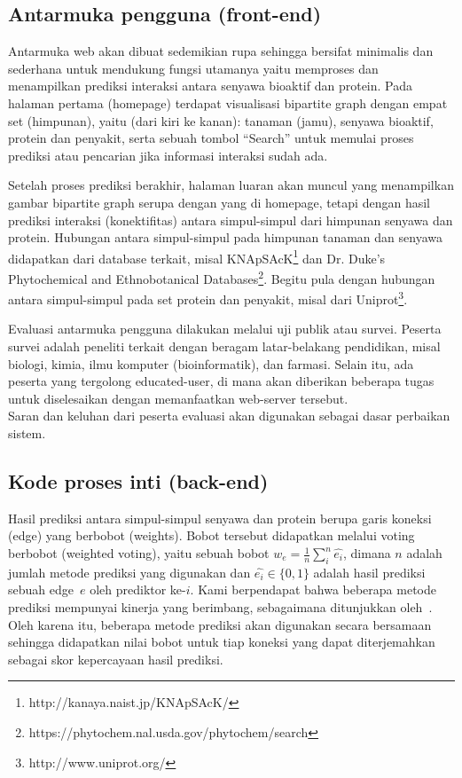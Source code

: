 \subsection{Antarmuka pengguna (front-end)}
Antarmuka web akan dibuat sedemikian rupa sehingga bersifat minimalis dan sederhana untuk mendukung fungsi utamanya yaitu 
memproses dan menampilkan prediksi interaksi antara senyawa bioaktif dan protein.
Pada halaman pertama (homepage) terdapat visualisasi bipartite graph dengan empat set (himpunan), yaitu (dari kiri ke kanan): tanaman (jamu), senyawa bioaktif, protein dan penyakit, serta sebuah tombol ``Search'' untuk memulai proses prediksi atau pencarian jika informasi interaksi sudah ada.

Setelah proses prediksi berakhir, halaman luaran akan muncul yang menampilkan gambar bipartite graph serupa dengan yang di homepage, 
tetapi dengan hasil prediksi interaksi (konektifitas) antara simpul-simpul dari himpunan senyawa dan protein.
Hubungan antara simpul-simpul pada himpunan tanaman dan senyawa didapatkan dari database terkait, misal 
KNApSAcK\footnote{http://kanaya.naist.jp/KNApSAcK/} dan Dr. Duke's Phytochemical and Ethnobotanical Databases\footnote{https://phytochem.nal.usda.gov/phytochem/search}. 
Begitu pula dengan hubungan antara simpul-simpul pada set protein dan penyakit, misal dari Uniprot\footnote{http://www.uniprot.org/}.

Evaluasi antarmuka pengguna dilakukan melalui uji publik atau survei.
Peserta survei adalah peneliti terkait dengan beragam latar-belakang pendidikan, misal biologi, kimia, ilmu komputer (bioinformatik), dan farmasi.
Selain itu, ada peserta yang tergolong educated-user, di mana akan diberikan beberapa tugas untuk diselesaikan dengan memanfaatkan web-server tersebut. \\
Saran dan keluhan dari peserta evaluasi akan digunakan sebagai dasar perbaikan sistem.

\subsection{Kode proses inti (back-end)}
Hasil prediksi antara simpul-simpul senyawa dan protein berupa garis koneksi (edge) yang berbobot (weights).
Bobot tersebut didapatkan melalui voting berbobot (weighted voting), yaitu sebuah bobot $w_e= \frac{1}{n} \sum_{i}^{n} \hat{e_i}$, dimana
$n$ adalah jumlah metode prediksi yang digunakan dan $\hat{e_i} \in \{0,1\}$ adalah hasil prediksi sebuah edge~$e$ oleh prediktor ke-$i$.
Kami berpendapat bahwa beberapa metode prediksi mempunyai kinerja yang berimbang, sebagaimana ditunjukkan oleh~\cite{Chen17082015}.
Oleh karena itu, beberapa metode prediksi akan digunakan secara bersamaan sehingga didapatkan nilai bobot untuk tiap koneksi yang dapat diterjemahkan sebagai skor kepercayaan hasil prediksi.

